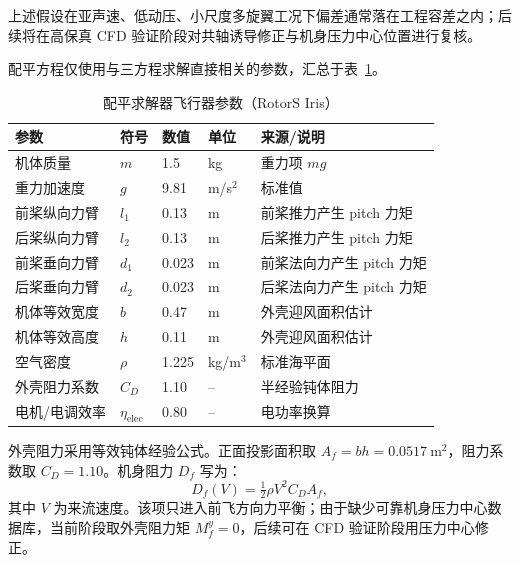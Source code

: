 上述假设在亚声速、低动压、小尺度多旋翼工况下偏差通常落在工程容差之内；后续将在高保真 CFD 验证阶段对共轴诱导修正与机身压力中心位置进行复核。

配平方程仅使用与三方程求解直接相关的参数，汇总于表~\ref{tab:uav_params}。

\begin{table}[H]
  \centering
  \caption{配平求解器飞行器参数（RotorS Iris）}
  \label{tab:uav_params}
  \small
  \renewcommand{\arraystretch}{1.12}
  \begin{tabularx}{\textwidth}{p{3.0cm} p{2.0cm} p{2.2cm} p{1.7cm} X}
    \toprule
    参数 & 符号 & 数值 & 单位 & 来源/说明 \\
    \midrule
    机体质量              & $m$            & 1.5       & kg       & 重力项 $mg$ \\
    重力加速度             & $g$            & 9.81      & m/s$^2$  & 标准值 \\
    前桨纵向力臂            & $l_1$          & 0.13      & m        & 前桨推力产生 pitch 力矩 \\
    后桨纵向力臂            & $l_2$          & 0.13      & m        & 后桨推力产生 pitch 力矩 \\
    前桨垂向力臂            & $d_1$          & 0.023     & m        & 前桨法向力产生 pitch 力矩 \\
    后桨垂向力臂            & $d_2$          & 0.023     & m        & 后桨法向力产生 pitch 力矩 \\
    机体等效宽度            & $b$            & 0.47      & m        & 外壳迎风面积估计 \\
    机体等效高度            & $h$            & 0.11      & m        & 外壳迎风面积估计 \\
    空气密度               & $\rho$         & 1.225     & kg/m$^3$ & 标准海平面 \\
    外壳阻力系数            & $C_D$          & 1.10      & --       & 半经验钝体阻力 \\
    电机/电调效率           & $\eta_\text{elec}$ & 0.80  & --       & 电功率换算 \\
    \bottomrule
  \end{tabularx}
\end{table}

外壳阻力采用等效钝体经验公式。正面投影面积取 $A_f=b h=0.0517\ \text{m}^2$，阻力系数取 $C_D=1.10$。机身阻力 $D_f$ 写为：
\begin{equation}
D_f(V) = \tfrac{1}{2}\rho V^2 C_D A_f,
\end{equation}
其中 $V$ 为来流速度。该项只进入前飞方向力平衡；由于缺少可靠机身压力中心数据库，当前阶段取外壳阻力矩 $M_f^y=0$，后续可在 CFD 验证阶段用压力中心修正。

